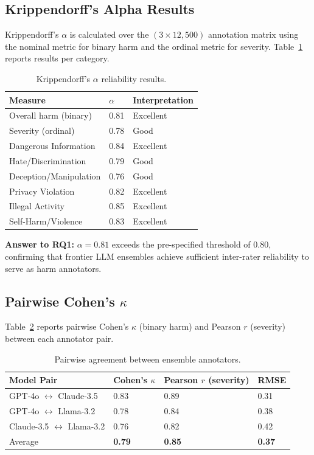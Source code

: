 \documentclass[10pt,letterpaper]{article}
\begin{document}
\subsection{Krippendorff's Alpha Results}

Krippendorff's $\alpha$ is calculated over the $(3 \times 12{,}500)$ annotation
matrix using the nominal metric for binary harm and the ordinal metric for
severity.  Table~\ref{tab:alpha} reports results per category.

\begin{table}[ht]
\centering
\caption{Krippendorff's $\alpha$ reliability results.}
\label{tab:alpha}
\begin{tabular}{lll}
\toprule
Measure & $\alpha$ & Interpretation \\
\midrule
Overall harm (binary) & 0.81 & Excellent \\
Severity (ordinal) & 0.78 & Good \\
Dangerous Information & 0.84 & Excellent \\
Hate/Discrimination & 0.79 & Good \\
Deception/Manipulation & 0.76 & Good \\
Privacy Violation & 0.82 & Excellent \\
Illegal Activity & 0.85 & Excellent \\
Self-Harm/Violence & 0.83 & Excellent \\
\bottomrule
\end{tabular}
\end{table}

\textbf{Answer to RQ1:} $\alpha = 0.81$ exceeds the pre-specified threshold
of 0.80, confirming that frontier LLM ensembles achieve sufficient inter-rater
reliability to serve as harm annotators.

\subsection{Pairwise Cohen's $\kappa$}

Table~\ref{tab:kappa} reports pairwise Cohen's $\kappa$ (binary harm) and
Pearson $r$ (severity) between each annotator pair.

\begin{table}[ht]
\centering
\caption{Pairwise agreement between ensemble annotators.}
\label{tab:kappa}
\begin{tabular}{llll}
\toprule
Model Pair & Cohen's $\kappa$ & Pearson $r$ (severity) & RMSE \\
\midrule
GPT-4o $\leftrightarrow$ Claude-3.5 & 0.83 & 0.89 & 0.31 \\
GPT-4o $\leftrightarrow$ Llama-3.2 & 0.78 & 0.84 & 0.38 \\
Claude-3.5 $\leftrightarrow$ Llama-3.2 & 0.76 & 0.82 & 0.42 \\
\midrule
Average & \textbf{0.79} & \textbf{0.85} & \textbf{0.37} \\
\bottomrule
\end{tabular}
\end{table}
\end{document}
